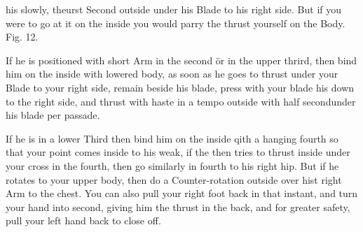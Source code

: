\newpage


\newpage



his slowly, theurst Second outside under his Blade to his right
side. But if you were to go at it on the inside you would parry the
thrust yourself on the Body. Fig. 12.

\exercise{}

If he is positioned with short Arm in the second ör in the upper thrird, then bind him on the inside with lowered body, as soon as he goes to thrust under your Blade to your right side, remain beside his blade, press with your blade his down to the right side, and thrust with haste in a tempo outside with half secondunder his blade per passade.

\exercise{}


If he is in a lower Third then bind him on the inside qith a hanging fourth so that your point comes inside to his weak, if the then tries to thrust inside under your cross in the fourth, then go similarly in fourth to his right hip. But if he rotates to your upper body, then do a Counter-rotation outside over hist right Arm to the chest. You can also pull your right foot back in that instant, and turn your hand into second, giving him the thrust in the back, and for greater safety, pull your left hand back to close off.

